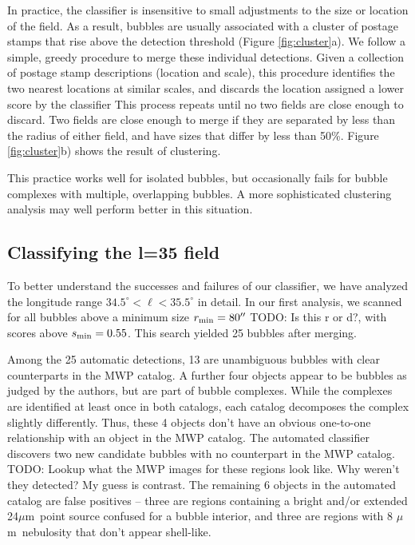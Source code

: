 \documentclass[preprint]{aastex}
\newcommand{\todo}[1]{{\color[rgb]{0, .5, .5} TODO: #1}}
\newcommand{\um}[0]{$\mu$m}
\begin{document}
In practice, the classifier is insensitive to small adjustments to the size or location of the field. As a result, bubbles are usually associated with a cluster of postage stamps that rise above the detection threshold (Figure \ref{fig:cluster}a). We follow a simple, greedy procedure to merge these individual detections. Given a collection of postage stamp descriptions (location and scale), this procedure identifies the two nearest locations at similar scales, and discards the location assigned a lower score by the classifier This process repeats until no two fields are close enough to discard. Two fields are close enough to merge if they are separated by less than the radius of either field, and have sizes that differ by less than 50\%. Figure \ref{fig:cluster}b) shows the result of clustering.

This practice works well for isolated bubbles, but occasionally fails for bubble complexes with multiple, overlapping bubbles. A more sophisticated clustering analysis may well perform better in this situation.

\subsection{Classifying the l=35 field}
\label{sec:case_study}
To better understand the successes and failures of our classifier, we have analyzed the longitude range $34.5^\circ < \ell < 35.5^\circ$ in detail. In our first analysis, we scanned for all bubbles above a minimum size $r _{\rm min} = 80''$ \todo{Is this r or d?}, with scores above $s_{\rm min} = 0.55$. This search yielded 25 bubbles after merging. 

Among the 25 automatic detections, 13 are unambiguous bubbles with clear counterparts in the MWP catalog. A further four objects appear to be bubbles as judged by the authors, but are part of bubble complexes. While the complexes are identified at least once in both catalogs, each catalog decomposes the complex slightly differently. Thus, these 4 objects don't have an obvious one-to-one relationship with an object in the MWP catalog. The automated classifier discovers two new candidate bubbles with no counterpart in the MWP catalog. \todo{Lookup what the MWP images for these regions look like. Why weren't they detected? My guess is contrast}. The remaining 6 objects in the automated catalog are false positives -- three are regions containing a bright and/or extended 24\um\, point source confused for a bubble interior, and three are regions with 8 \um\, nebulosity that don't appear shell-like.
\end{document}
